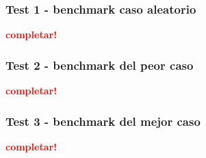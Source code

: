 \vspace*{0.3cm}

\subsubsection{Test 1 - benchmark caso aleatorio}

\textcolor{red}{\textbf{completar!}}


\newpage
\subsubsection{Test 2 - benchmark del peor caso}

\textcolor{red}{\textbf{completar!}}


\newpage
\subsubsection{Test 3 - benchmark del mejor caso}

\textcolor{red}{\textbf{completar!}}
